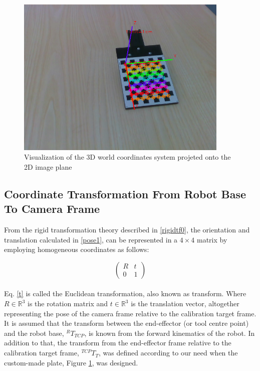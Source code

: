 \begin{figure}[!h]
\begin{center}
\includegraphics[width=4in]{figures03/calibrationtarget1.png}
\caption{Visualization of the 3D world coordinates system projeted onto the 2D image plane}
\label{fig:target3}
\end{center}
\end{figure}



\subsection{Coordinate Transformation From Robot Base To Camera Frame}
From the rigid transformation theory described in \ref{rigidtf0}, the orientation and translation calculated in \ref{pose1}, can be represented in a $4\times4$ matrix by employing homogeneous coordinates as follows:

\begin{equation}
\begin{pmatrix}
R & t \\ \label{t}
0 & 1
\end{pmatrix}
\end{equation}
\\
Eq. \ref{t} is called the Euclidean transformation, also known as transform. Where $R \in \mathbb{R}^{3}$ is the rotation matrix and $t \in \mathbb{R}^{3}$ is the translation vector, altogether representing the pose of the camera frame relative to the calibration target frame.\\
It is assumed that the transform between the end-effector (or tool centre point) and the robot base, $ ^{R}T_{TCP}$, is known from the forward kinematics of the robot. In addition to that, the transform from the end-effector frame relative to the calibration target frame, $ ^{TCP}T_{T}$, was defined according to our need when the custom-made plate, Figure \ref{fig:target3}, was designed.

